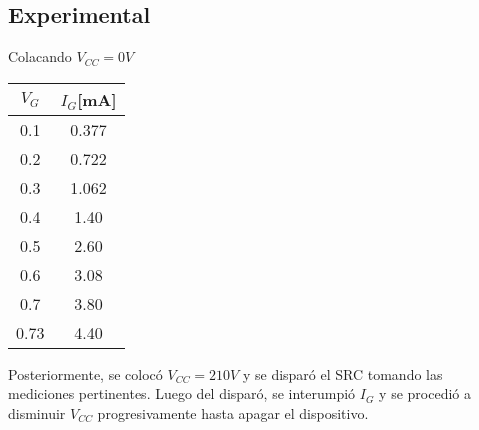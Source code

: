 \subsection{Experimental} %
Colacando $V_{CC}=0V$ 
\par 
\begin{minipage}{0.3\linewidth}
  \centering
  \begin{table}[H]
    \begin{center}
      \begin{tabular}{c|c}
        $V_{G}$ &$I_{G}$[mA]   \\
        \hline
        0.1   &0.377 \\
        0.2   &0.722 \\
        0.3   &1.062 \\
        0.4   &1.40  \\
        0.5   &2.60  \\
        0.6   &3.08  \\
        0.7   &3.80  \\
        0.73  &4.40  \\
      \end{tabular}
    \end{center} 
  \end{table}
\end{minipage}
\begin{minipage}{0.7\linewidth}
  \centering
\end{minipage}
Posteriormente, se colocó $V_{CC}=210V$ y se disparó el SRC tomando las mediciones pertinentes. 
Luego del disparó, se interumpió $I_G$ y se procedió a disminuir $V_{CC}$ progresivamente hasta apagar el dispositivo.
